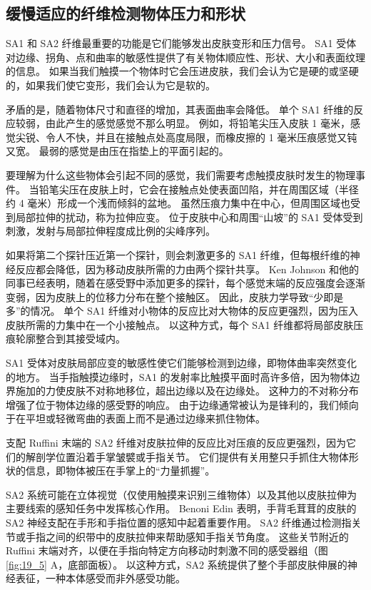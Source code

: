 \subsection{缓慢适应的纤维检测物体压力和形状}

SA1 和 SA2 纤维最重要的功能是它们能够发出皮肤变形和压力信号。 
SA1 受体对边缘、拐角、点和曲率的敏感性提供了有关物体顺应性、形状、大小和表面纹理的信息。 
如果当我们触摸一个物体时它会压进皮肤，我们会认为它是硬的或坚硬的，如果我们使它变形，我们会认为它是软的。


矛盾的是，随着物体尺寸和直径的增加，其表面曲率会降低。 
单个 SA1 纤维的反应较弱，由此产生的感觉感觉不那么明显。 
例如，将铅笔尖压入皮肤 1 毫米，感觉尖锐、令人不快，并且在接触点处高度局限，而橡皮擦的 1 毫米压痕感觉又钝又宽。 
最弱的感觉是由压在指垫上的平面引起的。


要理解为什么这些物体会引起不同的感觉，我们需要考虑触摸皮肤时发生的物理事件。 
当铅笔尖压在皮肤上时，它会在接触点处使表面凹陷，并在周围区域（半径约 4 毫米）形成一个浅而倾斜的盆地。 
虽然压痕力集中在中心，但周围区域也受到局部拉伸的扰动，称为拉伸应变。 
位于皮肤中心和周围“山坡”的 SA1 受体受到刺激，发射与局部拉伸程度成比例的尖峰序列。


如果将第二个探针压近第一个探针，则会刺激更多的 SA1 纤维，但每根纤维的神经反应都会降低，因为移动皮肤所需的力由两个探针共享。 
Ken Johnson 和他的同事已经表明，随着在感受野中添加更多的探针，每个感觉末端的反应强度会逐渐变弱，因为皮肤上的位移力分布在整个接触区。 因此，皮肤力学导致“少即是多”的情况。 
单个 SA1 纤维对小物体的反应比对大物体的反应更强烈，因为压入皮肤所需的力集中在一个小接触点。 以这种方式，每个 SA1 纤维都将局部皮肤压痕轮廓整合到其接受域内。


SA1 受体对皮肤局部应变的敏感性使它们能够检测到边缘，即物体曲率突然变化的地方。 
当手指触摸边缘时，SA1 的发射率比触摸平面时高许多倍，因为物体边界施加的力使皮肤不对称地移位，超出边缘以及在边缘处。 
这种力的不对称分布增强了位于物体边缘的感受野的响应。 
由于边缘通常被认为是锋利的，我们倾向于在平坦或轻微弯曲的表面上而不是通过边缘来抓住物体。


支配 Ruffini 末端的 SA2 纤维对皮肤拉伸的反应比对压痕的反应更强烈，因为它们的解剖学位置沿着手掌皱襞或手指关节。 
它们提供有关用整只手抓住大物体形状的信息，即物体被压在手掌上的“力量抓握”。


SA2 系统可能在立体视觉（仅使用触摸来识别三维物体）以及其他以皮肤拉伸为主要线索的感知任务中发挥核心作用。 
Benoni Edin 表明，手背毛茸茸的皮肤的 SA2 神经支配在手形和手指位置的感知中起着重要作用。 
SA2 纤维通过检测指关节或手指之间的织带中的皮肤拉伸来帮助感知手指关节角度。 
这些关节附近的 Ruffini 末端对齐，以便在手指向特定方向移动时刺激不同的感受器组（图 \ref{fig:19_5} A，底部面板）。 
以这种方式，SA2 系统提供了整个手部皮肤伸展的神经表征，一种本体感受而非外感受功能。



